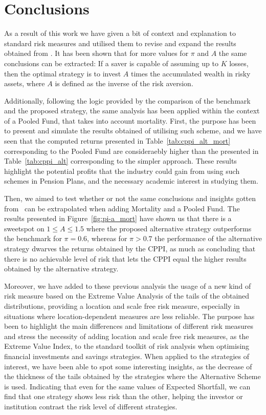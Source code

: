 \section{Conclusions}

As a result of this work we have given a bit of context and explanation to standard risk measures and utilised them to revise and expand the results obtained from \cite{a:guillen-optimisation}. It has been shown that for more values for $\pi$ and $A$ the same conclusions can be extracted: If a saver is capable of assuming up to $K$ losses, then the optimal strategy is to invest $A$ times the accumulated wealth in risky assets, where $A$ is defined as the inverse of the risk aversion.

Additionally, following the logic provided by the comparison of the benchmark and the proposed strategy, the same analysis has been applied within the context of a Pooled Fund, that takes into account mortality. First, the purpose has been to present and simulate the results obtained of utilising such scheme, and we have seen that the computed returns presented in Table~\ref{tab:cppi_alt_mort} corresponding to the Pooled Fund are consideraebly higher than the presented in Table~\ref{tab:cppi_alt} corresponding to the simpler approach. These results highlight the potential profits that the industry could gain from using such schemes in Pension Plans, and the necessary academic interest in studying them.

Then, we aimed to test whether or not the same conclusions and insights gotten from~\cite{a:guillen-optimisation} can be extrapolated when adding Mortality and a Pooled Fund. The results presented in Figure~\ref{fig:pi-a_mort} have shown us that there is a sweetspot on $1 \leq A \leq 1.5$ where the proposed alternative strategy outperforms the benchmark for $\pi = 0.6$, whereas for $\pi > 0.7$ the performance of the alternative strategy dwarves the returns obtained by the CPPI, as much as concluding that there is no achievable level of risk that lets the CPPI equal the higher results obtained by the alternative strategy.

Moreover, we have added to these previous analysis the usage of a new kind of risk measure based on the Extreme Value Analysis of the tails of the obtained distributions, providing a location and scale free risk measure, especially in situations where location-dependent measures are less reliable. The purpose has been to highlight the main differences and limitations of different risk measures and stress the necessity of adding location and scale free risk measures, as the Extreme Value Index, to the standard toolkit of risk analysis when optimising financial investments and savings strategies. When applied to the strategies of interest, we have been able to spot some interesting insights, as the decrease of the thickness of the tails obtained by the strategies where the Alternative Scheme is used. Indicating that even for the same values of Expected Shortfall, we can find that one strategy shows less risk than the other, helping the investor or institution contrast the risk level of different strategies.

